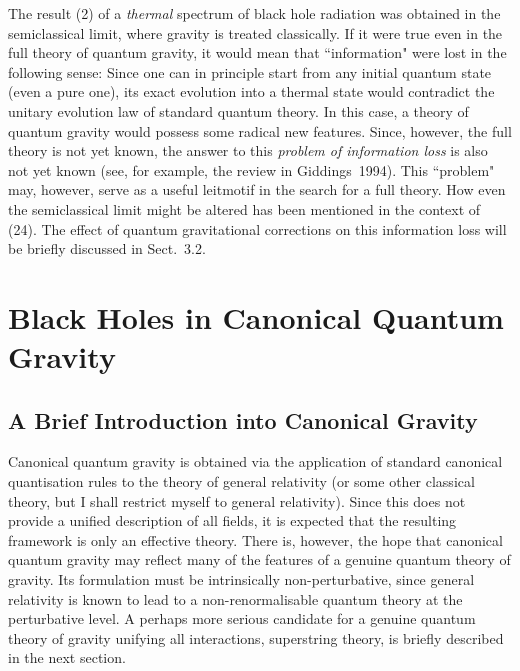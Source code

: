 The result (2) of a {\em thermal} spectrum of black hole
radiation was obtained in the semiclassical limit, where
gravity is treated classically. If it were true even in the full
theory of quantum gravity, it would mean that ``information"
were lost in the following sense: Since one can in principle
start from any initial quantum state (even a pure one),
its exact evolution into a thermal state would contradict
the unitary evolution law of standard quantum theory.
In this case, a theory of quantum gravity would possess some
radical new features. Since, however, the full theory is not
yet known, the answer to this {\em problem of information
loss} is also not yet known (see, for example, the
review in Giddings~1994). This ``problem" may, however, serve as
a useful leitmotif in the search for a full theory. How even the
semiclassical limit might be altered has been mentioned in
the context of (24). The effect of quantum gravitational
corrections on this information loss will be briefly discussed
in Sect.~3.2.

\section{Black Holes in Canonical Quantum Gravity}
\subsection{A Brief Introduction into Canonical Gravity}

Canonical quantum gravity is obtained via the application
of standard canonical quantisation rules to the theory of
general relativity (or some other classical theory, but I shall restrict
myself to general relativity). Since this does not provide a unified 
description of all fields, it is expected that the resulting
framework is only an effective theory. There is, however, the hope
that canonical quantum gravity may reflect many of the features
of a genuine quantum theory of gravity. Its formulation must be
intrinsically non-perturbative, since general relativity is known
to lead to a non-renormalisable quantum theory at the perturbative
level.
A perhaps more serious candidate for a genuine
quantum theory of gravity
unifying all interactions, superstring theory, is
briefly described in the next section.

